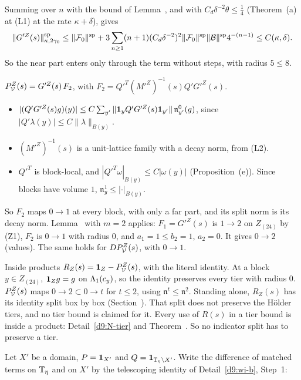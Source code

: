 \begin{detail}
\begin{step}[(Z1)]
Summing over $n$ with the bound of Lemma~, and with $C_d\delta^{-2}\theta\le\frac14$ (Theorem~(a) at (L1) at the rate $\kappa+\delta$), gives
\[
\|G'^Z(s)\|^{\rm sp}_{\kappa,2\gamma_0}\le\|\mathcal F_0\|^{\rm sp}+3\sum_{n\ge1}(n+1)(C_d\delta^{-2})^2\|\mathcal F_0\|^{\rm sp}\|\mathcal B\|^{\rm sp}4^{-(n-1)}\le C(\kappa,\delta) .
\]
So the near part enters only through the term without steps, with radius $5\le8$.
\end{step}
\begin{step}[(Z2)]
$P^Z_\mathcal V(s)=G'^Z(s)\,F_2$, with $F_2=Q'^T(M'^Z)^{-1}(s)Q'G'^Z(s)$.
\begin{itemize}
\item $|(Q'G'^Z(s)g)(y)|\le C\sum_{y'}\|\mathbf 1_yQ'G'^Z(s)\mathbf 1_{y'}\|\,\mathfrak n^0_{y'}(g)$, since $|Q'\lambda(y)|\le C\|\lambda\|_{B(y)}$.
\item $(M'^Z)^{-1}(s)$ is a unit-lattice family with a decay norm, from (L2).
\item $Q'^T$ is block-local, and $|Q'^T\omega|_{B(y)}\le C|\omega(y)|$ (Proposition~(e)). Since blocks have volume $1$, $\mathfrak n^1_y\le|\cdot|_{B(y)}$.
\end{itemize}
So $F_2$ maps $0\to1$ at every block, with only a far part, and its split norm is its decay norm. Lemma~ with $m=2$ applies: $F_1=G'^Z(s)$ is $1\to2$ on $Z_{(24)}$ by (Z1), $F_2$ is $0\to1$ with radius $0$, and $a_1=1\le b_2=1$, $a_2=0$. It gives $0\to2$ (values). The same holds for $DP^Z_\mathcal V(s)$, with $0\to1$.
\end{step}
\begin{step}[(Z3)]
Inside products $R_Z(s)=\mathbf 1_Z-P^Z_\mathcal V(s)$, with the literal identity. At a block $y\in Z_{(24)}$, $\mathbf 1_Zg=g$ on $\Lambda_1(c_y)$, so the identity preserves every tier with radius $0$. $P^Z_\mathcal V(s)$ maps $0\to2\subset0\to t$ for $t\le2$, using $\mathfrak n^t\le\mathfrak n^2$. Standing alone, $R_Z(s)$ has its identity split box by box (Section~). That split does not preserve the H\"older tiers, and no tier bound is claimed for it. Every use of $R(s)$ in a tier bound is inside a product: Detail~\ref{d9:N-tier} and Theorem~. So no indicator split has to preserve a tier.
\end{step}
\begin{step}[Seams]
Let $X'$ be a domain, $P=\mathbf 1_{X'}$ and $Q=\mathbf 1_{\mathbb T_\eta\setminus X'}$. Write the difference of matched terms on $\mathbb T_\eta$ and on $X'$ by the telescoping identity of Detail~\ref{d9:wi-b}, Step~1:

\end{step}
\end{detail}
